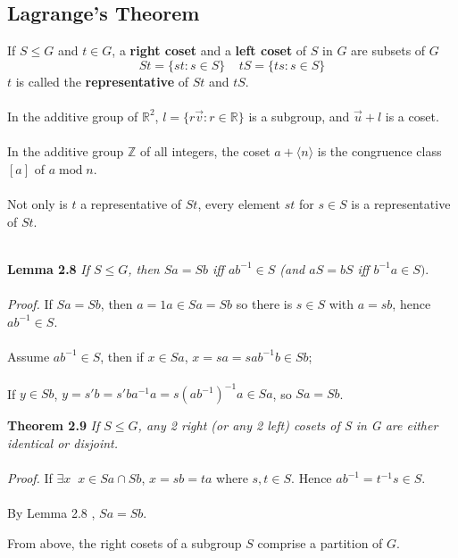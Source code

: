 \documentclass{article}
\begin{document}
\subsection{Lagrange's Theorem}
If \(S\le G\) and \(t\in G\), a \textbf{right coset} and a \textbf{left coset} of \(S\) in \(G\) are subsets of \(G\) 
\[St=\{st: s\in S\}\;\;\;\;tS=\{ts: s\in S\}\]
\(t\) is called the \textbf{representative} of \(St\) and \(tS\).\\\\
In the additive group of \(\mathbb{R}^{2}\), \(l=\{r\vec{v}: r\in\mathbb{R}\}\) is a subgroup, and \(\vec{u}+l\) is a coset.\\\\
In the additive group \(\mathbb{Z}\) of all integers, the coset \(a+\langle n\rangle\) is the congruence class \([a]\) of \(a\;\text{mod}\;n\).\\\\
Not only is \(t\) a representative of \(St\), every element  \(st\) for \(s\in S\) is a representative of \(St\).\\\\
\begin{greenrules}\color{OliveGreen}
\textbf{Lemma 2.8} \textit{If \(S\le G\), then \(Sa=Sb\) iff \(ab^{-1}\in S\) (and \(aS=bS\) iff \(b^{-1}a\in S).\)}\\\\\color{black}
\textit{Proof.} If \(Sa=Sb\), then \(a=1a\in Sa= Sb\) so there is \(s\in S\) with \(a=sb\), hence \(ab^{-1}\in S\).\\\\
Assume \(ab^{-1}\in S\), then if \(x\in Sa\), \(x=sa=sab^{-1}b\in Sb\);\\\\
\null\qquad If \(y\in Sb\), \(y=s'b=s'ba^{-1}a=s(ab^{-1})^{-1}a\in Sa\), so \(Sa=Sb\).
\end{greenrules}
\begin{redrules}\color{red}
\textbf{Theorem 2.9} \textit{If \(S\le G\), any 2 right (or any 2 left) cosets of S in G are either identical or disjoint.}\\\\\color{black}
\textit{Proof.} If \(\exists x\;\;x\in Sa\cap Sb\), \(x=sb=ta\) where \(s,t\in S\). Hence \(ab^{-1}=t^{-1}s\in S\).\\\\
By \color{gray}Lemma 2.8 \color{black}, \(Sa=Sb\).
\end{redrules}
From above, the right cosets of a subgroup \(S\) comprise a partition of \(G\).\\\\
\end{document}
